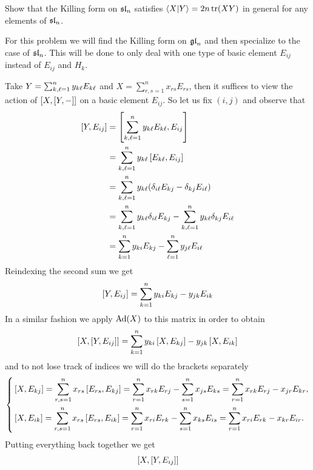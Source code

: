 \documentclass[12pt]{memoir}
\begin{document}
\begin{Ej}[Exercise 6]
    Show that the Killing form on $\mathfrak{sl}_n$ satisfies $\braket{X}{Y}=2n\tr(XY)$ in general for any elements of $\mathfrak{sl}_n$.
\end{Ej}
\begin{ptcbr}
    For this problem we will find the Killing form on $\mathfrak{gl}_n$ and then specialize to the case of $\mathfrak{sl}_n$. This will be done to only deal with one type of basic element $E_{ij}$ instead of $E_{ij}$ and $H_k$.\par
    Take $Y=\sum_{k,\ell=1}^n y_{k\ell}E_{k\ell}$ and $X=\sum_{r,s=1}^n x_{rs}E_{rs}$, then it suffices to view the action of $\left\lbrack X,\left\lbrack Y,-\right\rbrack\right\rbrack$ on a basic element $E_{ij}$. So let us fix $(i,j)$ and observe that 
    \begin{align*}
        \left\lbrack Y,E_{ij}\right\rbrack&=\left\lbrack\sum_{k,\ell=1}^n y_{k\ell}E_{k\ell},E_{ij}\right\rbrack\\
        &=\sum_{k,\ell=1}^n y_{k\ell}\left\lbrack E_{k\ell},E_{ij}\right\rbrack\\
        &=\sum_{k,\ell=1}^n y_{k\ell}(\delta_{i\ell}E_{kj}-\delta_{kj}E_{i\ell})\\
        &=\sum_{k,\ell=1}^n y_{k\ell}\delta_{i\ell}E_{kj}-\sum_{k,\ell=1}^ny_{k\ell}\delta_{kj}E_{i\ell}\\
        &=\sum_{k=1}^n y_{ki}E_{kj}-\sum_{\ell=1}^ny_{j\ell}E_{i\ell}
    \end{align*}
    Reindexing the second sum we get 
    $$\left\lbrack Y,E_{ij}\right\rbrack=\sum_{k=1}^n y_{ki}E_{kj}-y_{jk}E_{ik}$$
    In a similar fashion we apply $\operatorname{Ad}(X)$ to this matrix in order to obtain
    $$\left\lbrack X,\left\lbrack Y,E_{ij}\right\rbrack\right\rbrack=\sum_{k=1}^n y_{ki}\left\lbrack X,E_{kj}\right\rbrack-y_{jk}\left\lbrack X,E_{ik}\right\rbrack$$
    and to not lose track of indices we will do the brackets separately
    $$
    \left\lbrace
    \begin{aligned}
        &\left\lbrack X,E_{kj}\right\rbrack=\sum_{r,s=1}^{n}x_{rs}\left\lbrack E_{rs},E_{kj}\right\rbrack=\sum_{r=1}^{n}x_{rk}E_{rj}-\sum_{s=1}^nx_{js}E_{ks}=\sum_{r=1}^{n}x_{rk}E_{rj}-x_{jr}E_{kr},\\
        &\left\lbrack X,E_{ik}\right\rbrack=\sum_{r,s=1}^{n}x_{rs}\left\lbrack E_{rs},E_{ik}\right\rbrack=\sum_{r=1}^{n}x_{ri}E_{rk}-\sum_{s=1}^nx_{ks}E_{is}=\sum_{r=1}^{n}x_{ri}E_{rk}-x_{kr}E_{ir}.
    \end{aligned}
    \right.
    $$
    Putting everything back together we get
    \begin{align*}
        &\bonj{X,\bonj{Y,E_{ij}}}\\

\end{align*}
\end{ptcbr}
\end{document}
